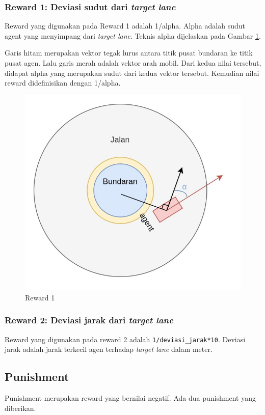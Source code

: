\subsubsection{Reward 1: Deviasi sudut dari \textit{target lane}}
Reward yang digunakan pada Reward 1 adalah 1/alpha. Alpha adalah sudut agent yang menyimpang dari \textit{target lane}. Teknis alpha dijelaskan pada Gambar \ref{fig:reward_anglediff_sketch}. 

Garis hitam merupakan vektor tegak lurus antara titik pusat bundaran ke titik pusat agen. Lalu garis merah adalah vektor arah mobil. Dari kedua nilai tersebut, didapat alpha yang merupakan sudut dari kedua vektor tersebut. Kemudian nilai reward didefinisikan dengan 1/alpha.

\begin{figure}[H] 
	\centering
	\includegraphics[width=1\linewidth]{images/reward_anglediff_sketch}
	\caption{Reward 1}
	\label{fig:reward_anglediff_sketch}
\end{figure}

\subsubsection{Reward 2: Deviasi jarak dari \textit{target lane}}
Reward yang digunakan pada reward 2 adalah \verb=1/deviasi_jarak*10=. Deviasi jarak adalah jarak terkecil agen terhadap \textit{target lane} dalam meter.

\subsection{Punishment}
\label{sec:punishment}
Punishment merupakan reward yang bernilai negatif. Ada dua punishment yang diberikan.

